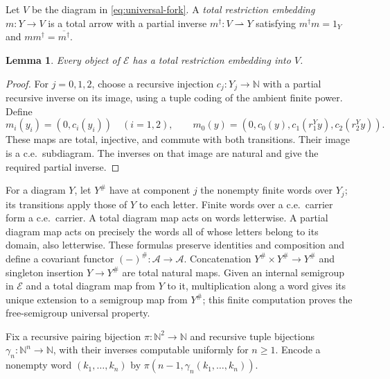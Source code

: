 \documentclass[11pt]{article}
\newtheorem{lemma}[theorem]{Lemma}
\newcommand{\N}{\mathbb N}
\begin{document}
Let $V$ be the diagram in \eqref{eq:universal-fork}.
A \emph{total restriction embedding} $m:Y\to V$ is a total
arrow with a partial inverse $m^\dagger:V\rightharpoonup Y$
satisfying $m^\dagger m=1_Y$ and $mm^\dagger=\overline{m^\dagger}$.

\begin{lemma}\label{lem:fork-dominance}
Every object of $\mathcal E$ has a total restriction embedding
into $V$.
\end{lemma}
\begin{proof}
For $j=0,1,2$, choose a recursive injection $c_j:Y_j\to\N$
with a partial recursive inverse on its image, using a tuple
coding of the ambient finite power. Define
\[
 m_i(y_i)=(0,c_i(y_i))\quad(i=1,2),\qquad
 m_0(y)=(0,c_0(y),c_1(r_1^Yy),c_2(r_2^Yy)).
\]
These maps are total, injective, and commute with both transitions.
Their image is a c.e.\ subdiagram. The inverses on that image
are natural and give the required partial inverse.
\end{proof}

For a diagram $Y$, let $Y^\#$ have at component $j$ the
nonempty finite words over $Y_j$; its transitions apply those
of $Y$ to each letter. Finite words over a c.e.\ carrier form
a c.e.\ carrier. A total diagram map acts on words letterwise.
A partial diagram map acts on precisely the words all of whose
letters belong to its domain, also letterwise. These formulas
preserve identities and composition and define a covariant functor
$(-)^\#:\mathcal A\to\mathcal A$. Concatenation
$Y^\#\times Y^\#\to Y^\#$ and singleton insertion
$Y\to Y^\#$ are total natural maps. Given an internal semigroup in
$\mathcal E$ and a total diagram map from $Y$ to it, multiplication along a word gives
its unique extension to a semigroup map from $Y^\#$; this
finite computation proves the free-semigroup universal property.

Fix a recursive pairing bijection
$\pi:\N^2\to\N$ and recursive tuple bijections
$\gamma_n:\N^n\to\N$, with their inverses computable uniformly
for $n\ge1$. Encode a nonempty word $(k_1,\ldots,k_n)$ by
$\pi(n-1,\gamma_n(k_1,\ldots,k_n))$.
\end{document}
